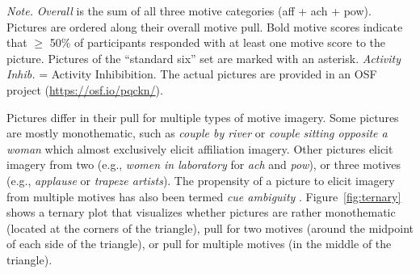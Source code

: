\documentclass[man,a4paper,mask]{apa6}\usepackage[]{graphicx}\usepackage[]{color}
\begin{document}
\begin{table}
\begin{threeparttable}
\begin{tabularx}{\textwidth}{rllllllr}
		
		\bottomrule
		\end{tabularx}
		\begin{tablenotes}[para,flushleft]
			{\small
			\vspace*{0.75em}
			\textit{Note.} \emph{Overall} is the sum of all three motive categories (aff + ach + pow). Pictures are ordered along their overall motive pull. Bold motive scores indicate that $\geq$ 50\% of participants responded with at least one motive score to the picture. Pictures of the ``standard six'' set are marked with an asterisk. \emph{Activity Inhib.} = Activity Inhibibition. The actual pictures are provided in an OSF project (\url{https://osf.io/pqckn/}).}
	      \end{tablenotes}
	  \end{threeparttable}
\end{table}


Pictures differ in their pull for multiple types of motive imagery. Some pictures are mostly monothematic, such as \emph{couple by river} or \emph{couple sitting opposite a woman} which almost exclusively elicit affiliation imagery. Other pictures elicit imagery from two (e.g., \emph{women in laboratory} for \emph{ach} and \emph{pow}), or three motives (e.g., \emph{applause} or \emph{trapeze artists}). The propensity of a picture to elicit imagery from multiple motives has also been termed \emph{cue ambiguity} \parencite{pang_ContentCodingMethods_2010,smith_MethodologicalConsiderationsSteps_1992,jacobs_MethodInvestigatingCue_1958}.
Figure~\ref{fig:ternary} shows a ternary plot \parencite{hamiltonGgternExtensionGgplot22017} that visualizes whether pictures are rather monothematic (located at the corners of the triangle), pull for two motives (around the midpoint of each side of the triangle), or pull for multiple motives (in the middle of the triangle).
\end{document}
